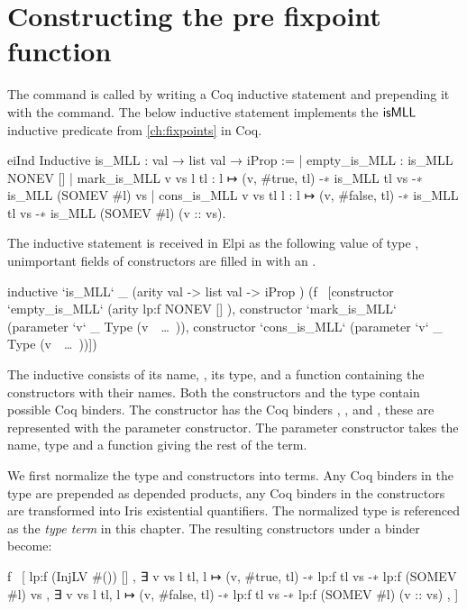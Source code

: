 \documentclass[thesis.tex]{subfiles}
\begin{document}
\section{Constructing the pre fixpoint function}\label{sec:pff}
The  command is called by writing a Coq inductive statement and prepending it with the  command. The below inductive statement implements the $\textsf{\upshape isMLL}$ inductive predicate from \cref{ch:fixpoints} in Coq.
\begin{coqcode}
  eiInd
  Inductive is_MLL : val → list val → iProp :=
      | empty_is_MLL : is_MLL NONEV []
      | mark_is_MLL v vs l tl : 
        l ↦ (v, #true, tl) -∗ is_MLL tl vs -∗ 
        is_MLL (SOMEV #l) vs
      | cons_is_MLL v vs tl l : 
        l ↦ (v, #false, tl) -∗ is_MLL tl vs -∗ 
        is_MLL (SOMEV #l) (v :: vs).
\end{coqcode}
The inductive statement is received in Elpi as the following value of type , unimportant fields of constructors are filled in with an \elpii{_}.
\begin{elpicode}
  inductive `is_MLL` _ 
    (arity {{ val -> list val -> iProp }})
    (f \ [constructor `empty_is_MLL` 
            (arity {{ lp:f NONEV [] }}), 
          constructor `mark_is_MLL` 
            (parameter `v` _ Type (v\ ~\ldots~)),
          constructor `cons_is_MLL` 
            (parameter `v` _ Type (v\ ~\ldots~))])
\end{elpicode}
The inductive consists of its name, , its type, and a function containing the constructors with their names. Both the constructors and the type contain possible Coq binders. The constructor  has the Coq binders , ,  and , these are represented with the parameter constructor. The parameter constructor takes the name, type and a function giving the rest of the term.

We first normalize the type and constructors into terms. Any Coq binders in the type are prepended as depended products, any Coq binders in the constructors are transformed into Iris existential quantifiers. The normalized type is referenced as the \emph{type term} in this chapter. The resulting constructors under a binder become:
\begin{elpicode}
  f \ [
    {{ lp:f (InjLV #()) [] }},
    {{ ∃ v vs l tl, l ↦ (v, #true, tl) -∗ lp:f tl vs -∗ 
                    lp:f (SOMEV #l) vs }},
    {{ ∃ v vs l tl, l ↦ (v, #false, tl) -∗ lp:f tl vs -∗ 
                    lp:f (SOMEV #l) (v :: vs) }},
  ]
\end{elpicode}
\end{document}
